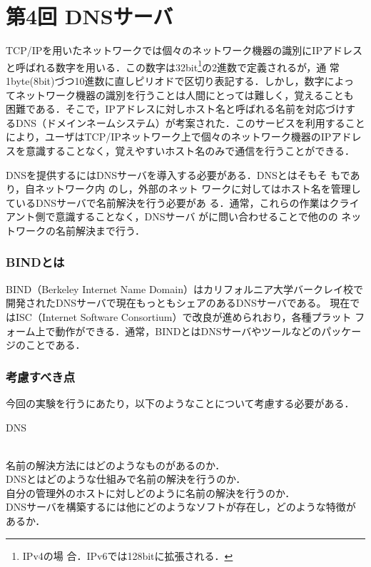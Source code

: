 \section{第4回 DNSサーバ}
TCP/IPを用いたネットワークでは個々のネットワーク機器の識別にIPアドレス
と呼ばれる数字を用いる．この数字は32bit\footnote{IPv4の場
  合．IPv6では128bitに拡張される．}の2進数で定義されるが，通
常1byte(8bit)づつ10進数に直しピリオドで区切り表記する．しかし，数字によっ
てネットワーク機器の識別を行うことは人間にとっては難しく，覚えることも
困難である．そこで，IPアドレスに対しホスト名と呼ばれる名前を対応づけす
るDNS（ドメインネームシステム）が考案された．このサービスを利用すること
により，ユーザはTCP/IPネットワーク上で個々のネットワーク機器のIPアドレ
スを意識することなく，覚えやすいホスト名のみで通信を行うことができる．

DNSを提供するにはDNSサーバを導入する必要がある．DNSとはそもそ
も\textbf{}であり，自ネットワーク内
の\textbf{}し，外部のネット
ワークに対してはホスト名を管理しているDNSサーバで名前解決を行う必要があ
る．通常，これらの作業はクライアント側で意識することなく，DNSサーバ
が\textbf{}に問い合わせることで他のの
ネットワークの名前解決まで行う．

\subsubsection*{BINDとは}
BIND（Berkeley Internet Name Domain）はカリフォルニア大学バークレイ校で
開発されたDNSサーバで現在もっともシェアのあるDNSサーバである。 現在で
はISC（Internet Software Consortium）で改良が進められおり，各種プラット
フォーム上で動作ができる．通常，BINDとはDNSサーバやツールなどのパッケー
ジのことである．

\subsubsection*{考慮すべき点}
今回の実験を行うにあたり，以下のようなことについて考慮する必要がある．
\begin{itemize}
{\bf \item{DNS}}\\
名前の解決方法にはどのようなものがあるのか．\\
DNSとはどのような仕組みで名前の解決を行うのか．\\
自分の管理外のホストに対しどのように名前の解決を行うのか．\\
DNSサーバを構築するには他にどのようなソフトが存在し，どのような特徴があるか．
\end{itemize}
